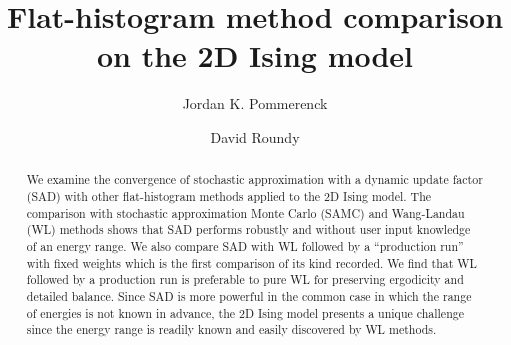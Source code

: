 \documentclass[letterpaper,twocolumn,amsmath,amssymb,pre,aps,10pt]{revtex4-1}
\begin{document}
\title{Flat-histogram method comparison on the 2D Ising model
}

\author{Jordan K. Pommerenck} \author{David Roundy}

\begin{abstract}
We examine the convergence of stochastic approximation with a dynamic
update factor (SAD) with other flat-histogram methods applied to the 2D
Ising model. The comparison with stochastic approximation Monte Carlo (SAMC)
and Wang-Landau (WL) methods shows that SAD performs robustly and without user
input knowledge of an energy range. We also compare SAD with WL followed by a
``production run'' with fixed weights which is the first comparison of its kind
recorded. We find that WL followed by a production run is preferable to pure WL
for preserving ergodicity and detailed balance. Since SAD is more powerful in
the common case in which the range of energies is not known in advance, the 2D
Ising model presents a unique challenge since the energy range is readily known
and easily discovered by WL methods.
\end{abstract}

\maketitle



\end{document}
